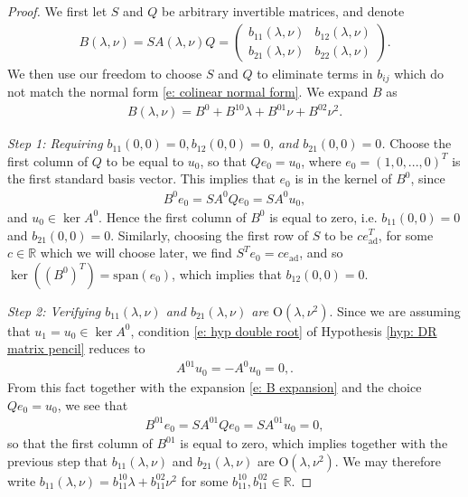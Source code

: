 \documentclass[11pt]{article}
\newcommand{\R}{\mathbb{R}}
\newcommand{\spn}{\text{\span}}
\numberwithin{equation}{section}
\numberwithin{prop}{section}
\renewcommand{\spn}{\mathrm{span}}
\begin{document}
\begin{proof}
	We first let $S$ and $Q$ be arbitrary invertible matrices, and denote 
	\begin{align}
	B(\lambda, \nu) = S A(\lambda, \nu) Q = \begin{pmatrix}
	b_{11} (\lambda, \nu) & b_{12} (\lambda, \nu) \\
	b_{21} (\lambda, \nu) & b_{22} (\lambda, \nu)
	\end{pmatrix}.
	\end{align}
	We then use our freedom to choose $S$ and $Q$ to eliminate terms in $b_{ij}$ which do not match the normal form \eqref{e: colinear normal form}. We expand $B$ as
	\begin{align}
	B(\lambda, \nu) = B^0 + B^{10} \lambda + B^{01} \nu + B^{02} \nu^2. \label{e: B expansion}
	\end{align}
	
	\emph{Step 1: Requiring $b_{11} (0,0) = 0, b_{12} (0,0) = 0$, and $b_{21} (0,0) = 0$.} Choose the first column of $Q$ to be equal to $u_0$, so that $Q e_0 = u_0$, where $e_0 = (1,0, ..., 0)^T$ is the first standard basis vector. This implies that $e_0$ is in the kernel of $B^0$, since 
	\begin{align}
	B^0 e_0 = S A^0 Q e_0 = S A^0 u_0,
	\end{align}
	and $u_0 \in \ker A^0$. Hence the first column of $B^0$ is equal to zero, i.e. $b_{11} (0,0) = 0$ and $b_{21} (0,0) = 0$. Similarly, choosing the first row of $S$ to be $c e_\mathrm{ad}^T$, for some $c \in \R$ which we will choose later, we find $S^T e_0 = c e_\mathrm{ad}$, and so $\ker ((B^0)^T) = \spn (e_0)$, which implies that $b_{12} (0,0) = 0$. 
	
	\emph{Step 2: Verifying $b_{11}(\lambda, \nu)$ and $b_{21} (\lambda, \nu)$ are $\mathrm{O}(\lambda,\nu^2).$} Since we are assuming that $u_1 = u_0 \in \ker A^0$, condition \eqref{e: hyp double root} of Hypothesis \ref{hyp: DR matrix pencil} reduces to 
	\begin{align}
	A^{01} u_0 = - A^0 u_0 = 0,. \label{e: co normal form A01 u0}
	\end{align}
	From this fact together with the expansion \eqref{e: B expansion} and the choice $Qe_0 = u_0$, we see that
	\begin{align*}
	B^{01} e_0 = S A^{01} Q e_0 = S A^{01} u_0 = 0, 
	\end{align*}
	so that the first column of $B^{01}$ is equal to zero, which implies together with the previous step that $b_{11} (\lambda, \nu)$ and $b_{21} (\lambda, \nu)$ are $\mathrm{O}(\lambda, \nu^2)$. We may therefore write $b_{11} (\lambda,\nu) = b_{11}^{10} \lambda + b_{11}^{02} \nu^2$ for some $b_{11}^{10}, b_{11}^{02} \in \R$. 
	

\end{proof}
\end{document}
